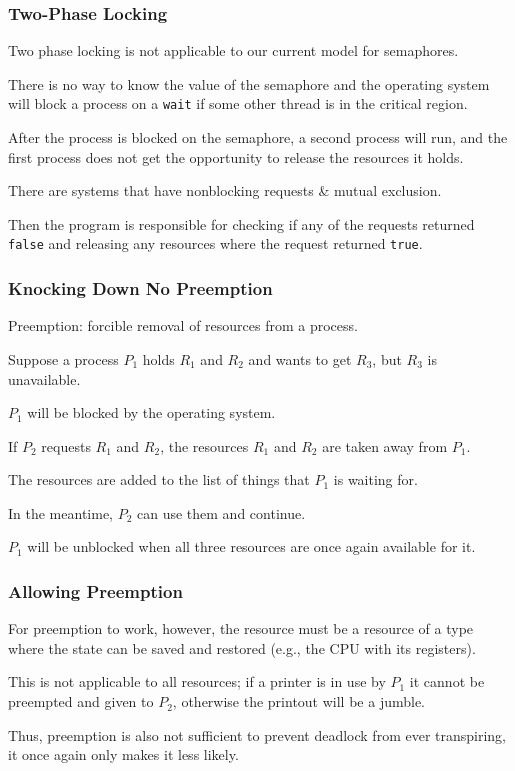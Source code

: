 \begin{frame}
\frametitle{Two-Phase Locking}

Two phase locking is not applicable to our current model for semaphores.

There is no way to know the value of the semaphore and the operating system will block a process on a \texttt{wait} if some other thread is in the critical region. 

After the process is blocked on the semaphore, a second process will run, and the first process does not get the opportunity to release the resources it holds. 

There are systems that have nonblocking requests \& mutual exclusion.

Then the program is responsible for checking if any of the requests returned \texttt{false} and releasing any resources where the request returned \texttt{true}.


\end{frame}


\begin{frame}
\frametitle{Knocking Down No Preemption}

Preemption: forcible removal of resources from a process.

Suppose a process $P_{1}$ holds $R_{1}$ and $R_{2}$ and wants to get $R_{3}$, but $R_{3}$ is unavailable. 

$P_{1}$ will be blocked by the operating system. 

If $P_{2}$ requests $R_{1}$ and $R_{2}$, the resources $R_{1}$ and $R_{2}$ are taken away from $P_{1}$.

The resources are added to the list of things that $P_{1}$ is waiting for.

In the meantime, $P_{2}$ can use them and continue. 

$P_{1}$ will be unblocked when all three resources are once again available for it.

\end{frame}


\begin{frame}
\frametitle{Allowing Preemption}

For preemption to work, however, the resource must be a resource of a type where the state can be saved and restored (e.g., the CPU with its registers). 

This is not applicable to all resources; if a printer is in use by $P_{1}$ it cannot be preempted and given to $P_{2}$, otherwise the printout will be a jumble. 

Thus, preemption is also not sufficient to prevent deadlock from ever transpiring, it once again only makes it less likely.

\end{frame}




